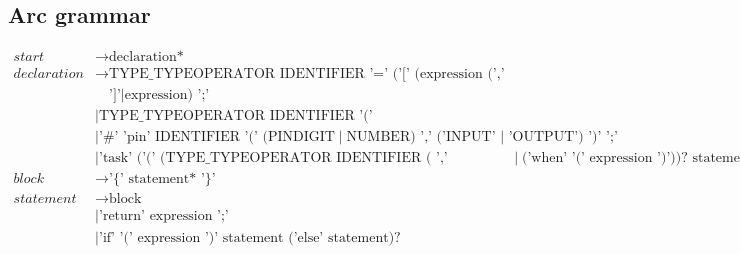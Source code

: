 \subsection{Arc grammar}\label{sec:arcgrammar}

\begin{align*}
    start       & \to \text{declaration*}                                                                                                                                                     \\ %
    declaration & \to \text{TYPE\_TYPEOPERATOR IDENTIFIER '=' ('[' (expression (',' expression)*)?}\\ & \quad \text{']'} \mid \text{expression) ';'}                                                           \\ %
                & \mid \text{TYPE\_TYPEOPERATOR IDENTIFIER '(' (TYPE\_TYPEOPERATOR IDENTIFIER (',' TYPE\_TYPEOPERATOR IDENTIFIER)*)? ')' statement*}                                          \\ %
                & \mid \text{'\#' 'pin' IDENTIFIER '(' (PINDIGIT} \mid \text{NUMBER) ',' ('INPUT' | 'OUTPUT') ')' ';' }                                                                       \\ %
                & \mid \text{'task' ('(' (TYPE\_TYPEOPERATOR IDENTIFIER ( ',' TYPE\_TYPEOPERATOR IDENTIFIER)*)? ')')? (('every' NUMBER)} \mid \text{('when' '(' expression ')'))? statement*} \\ %
    block       & \to \text{'\{' statement* '\}'}                                                                                                                                             \\
    statement   & \to \text{block}                                                                                                                                                            \\ %
                & \mid \text{'return' expression ';'}                                                                                                                                         \\ %
                & \mid \text{'if' '(' expression ')' statement ('else' statement)?}                                                                                                           \\ %

\end{align*}
